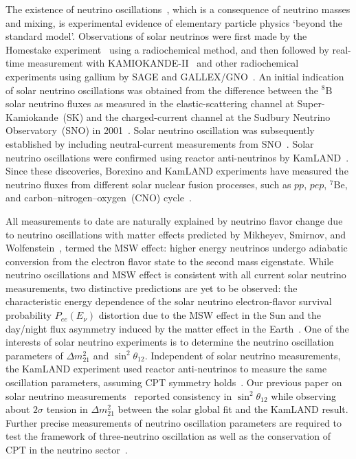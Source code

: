\documentclass[aps,prd,reprint,superscriptaddress,floatfix,altaffilletter,nofootinbib]{revtex4-2}
\begin{document}
The existence of neutrino oscillations~\cite{Maki:1962mu,Pontecorvo:1967fh}, which is a consequence of neutrino masses and mixing, is experimental evidence of elementary particle physics `beyond the standard model'. Observations of solar neutrinos were first made by the Homestake experiment~\cite{Davis:1968cp} using a radiochemical method, and then followed by real-time measurement with KAMIOKANDE-II~\cite{Hirata:1989zj} and other radiochemical experiments using gallium by SAGE and GALLEX/GNO~\cite{Abazov:1991rx, Anselmann:1992um, Altmann:2000ft}.
An initial indication of solar neutrino oscillations was obtained from the difference between the $\mathrm{^{8}B}$ solar neutrino fluxes as measured in the elastic-scattering channel at Super-Kamiokande~(SK) and the charged-current channel at the Sudbury Neutrino Observatory~(SNO) in 2001~\cite{Fukuda:2001nj, Ahmad:2001an}. Solar neutrino oscillation was subsequently established by including neutral-current measurements from SNO~\cite{Ahmad:2002jz}. 
Solar neutrino oscillations were confirmed using reactor 
anti-neutrinos by KamLAND~\cite{eguchi2003first}. Since these discoveries, Borexino and KamLAND experiments have measured the neutrino fluxes from different solar nuclear fusion processes, such as $pp$, $pep$, $\mathrm{^{7}Be}$, and carbon–nitrogen–oxygen~(CNO) cycle~\cite{Agostini:2017ixy,Agostini:2018uly, Gando:2014wjd, Agostini:2020mfq}. 

All measurements to date are naturally explained by neutrino flavor change due to neutrino oscillations with matter effects predicted by Mikheyev, Smirnov, and Wolfenstein~\cite{Mikheev:1986gs, Wolfenstein:1977ue}, termed the MSW effect: higher energy neutrinos undergo adiabatic conversion from the electron flavor state to the second mass eigenstate. While neutrino oscillations and MSW effect is consistent with all current solar neutrino measurements, two distinctive predictions are yet to be observed: the characteristic energy dependence of the solar neutrino electron-flavor survival probability $P_{ee}(E_\nu)$ distortion due to the MSW effect in the Sun and the day/night flux asymmetry induced by the matter effect in the Earth~\cite{Baltz:1986hn, Bouchez:1986kb, Carlson:1986ui, Cribier:1986ak, Petcov:1998su, Bakhti:2020tcj}.
One of the interests of solar neutrino experiments is to determine the neutrino oscillation parameters of $\varDelta m^{2}_{21}$ and $\sin^{2}\theta_{12}$. 
Independent of solar neutrino measurements, the KamLAND experiment used reactor anti-neutrinos to measure the same oscillation parameters, assuming CPT symmetry holds~\cite{Gando:2013nba}. 
Our previous paper on solar neutrino measurements~\cite{Abe:2016nxk} reported consistency in $\sin^{2}\theta_{12}$ while observing about $2\sigma$  tension in $\varDelta m^{2}_{21}$ between the solar global fit and the KamLAND result. 
Further precise measurements of neutrino oscillation parameters are required to test the framework of three-neutrino oscillation as well as the conservation of CPT in the neutrino sector~\cite{Bahcall:2002ia}.
\end{document}
